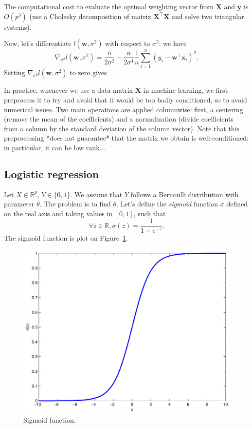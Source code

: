 \documentclass[12pt]{report}	%
\def\ts{\top}
\def\XX{\mathbf{X}}
\def\wb{\mathbf{w}}
\def\xb{\mathbf{x}}
\def\yb{\mathbf{y}}
\begin{document}
The computational cost to evaluate the optimal weighting vector from $\XX$ and $\yb$ is $O(p^3)$ (use a Cholesky decomposition of matrix $\XX^{\ts}\XX$ and solve two triangular systems).

Now, let's differentiate $l({\wb},\sigma^2)$ with respect to $\sigma^2$: we have
$$
\nabla_{\sigma^2}l({\wb},\sigma^2) = \frac{n}{2\sigma^2}-\frac{n}{2\sigma^4}\frac{1}{n}\sum_{i=1}^n{(y_i-{\wb}^{\ts}\xb_i)^2}.
$$
Setting $\nabla_{\sigma^2}l({\wb},\sigma^2)$ to zero gives \begin{center}\fbox{$\hat{\sigma}^2 = \frac{1}{n}\sum_{i=1}^n{(y_i-{\wb}^{\ts}\xb_i)^2}$.}
\end{center}

In practice, whenever we use a data matrix $\XX$ in machine learning, we first preprocess it to try and avoid that it would be too badly conditioned, so to avoid numerical issues. Two main operations are applied columnwise: first, a centering (remove the mean of the coefficients) and a normalization (divide coefficients from a column by the standard deviation of the column vector). Note that this preprocessing *does not guarantee* that the matrix we obtain is well-conditioned: in particular, it can be low rank... 

\subsection{Logistic regression}

Let $X\in\mathbb{R}^p$, $Y\in\lbrace 0,1 \rbrace$. We assume that $Y$ follows a Bernoulli distribution with parameter $\theta$. The problem is to find $\theta$. Let's define the \emph{sigmoid} function $\sigma$ defined on the real axis and taking values in $[0,1]$, such that $$\forall z \in \mathbb{R}, \sigma(z) = \frac{1}{1+e^{-z}}.$$The sigmoid function is plot on Figure~\ref{fig:sigmoid}.

\begin{figure}
\begin{center}
\includegraphics[width=.5\linewidth]{figures/sigmoid-eps-converted-to.pdf}
\caption{\label{fig:sigmoid}Sigmoid function.}
\end{center}
\end{figure}
\end{document}
